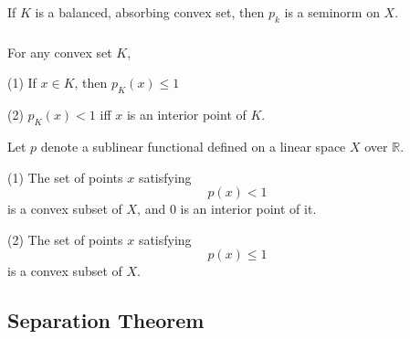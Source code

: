 \documentclass[12pt, oneside]{book}
\begin{document}
\begin{corollary}
    If $K$ is a balanced, absorbing convex set, then $p_k$ is a seminorm on $X$.
\end{corollary}

\subsubsection{}
\begin{theorem}
    For any convex set $K$,

    (1) If $x \in K$, then $p_K(x) \leq 1  $

    (2) $p_K(x)<1$ iff  $x$ is an interior point of $K$.

\end{theorem}

\begin{theorem}
    Let $p$ denote a sublinear functional defined on a linear space $X$ over $\mathbb{R}$.

    (1) The set of points $x$ satisfying
    \begin{equation*}
        p(x)<1
    \end{equation*}
    is a convex subset of $X$, and $0$ is an interior point of it.

    (2) The set of points $x$ satisfying
    \begin{equation*}
        p(x) \leq 1
    \end{equation*}
    is a convex subset of $X$.
\end{theorem}

\subsection{Separation Theorem}
\end{document}
